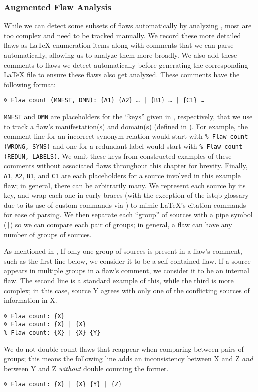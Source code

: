 \subsubsection{Augmented Flaw Analysis}\label{aug-flaw-analysis}
While we can detect some subsets of flaws automatically by analyzing
\ourApproachGlossary, most are too complex and need to be tracked manually. We
record these more detailed flaws as \LaTeX{} enumeration items along with
comments that we can parse automatically, allowing us to analyze them more
broadly. We also add these comments to flaws we detect automatically before
generating the corresponding \LaTeX{} file to ensure these flaws also get
analyzed. These comments have the following format:
\begin{displayquote}
    \texttt{\% Flaw count (MNFST, DMN): \{A1\} \{A2\} \dots{} | \{B1\} %
        \dots{} | \{C1\} \dots}
\end{displayquote}
\texttt{MNFST} and \texttt{DMN} are placeholders for the ``keys'' given in
, respectively, that we use to track a
flaw's manifestation(s) and domain(s) (defined in ). For
example, the comment line for an incorrect synonym relation would start with
\texttt{\% Flaw count (WRONG, SYNS)} and one for a redundant label would
start with \texttt{\% Flaw count (REDUN, LABELS)}. We omit these keys from
constructed examples of these comments without associated flaws throughout this
chapter for brevity. Finally, \texttt{A1}, \texttt{A2}, %
\texttt{B1}, and \texttt{C1} are each placeholders for a source involved in
this example flaw; in general, there can be arbitrarily many. We represent each
source by its \BibTeX{} key, and wrap each one in curly braces (with the
exception of the \acs{istqb} glossary due to its use of custom commands via
) to mimic \LaTeX{}'s citation commands for ease of parsing.
We then separate each ``group'' of sources with a pipe symbol (\texttt{|}) so
we can compare each pair of groups; in general, a flaw can have any number of
groups of sources.

As mentioned in , \oneSrcDistinct{} If only one group
of sources is present in a flaw's comment, such as the first line below, we
consider it to be a self-contained flaw. If a
source appears in multiple groups in a flaw's comment, we consider it to
be an internal flaw. The second line is a standard example of this, while the
third is more complex; in this case, source Y agrees with only one of the
conflicting sources of information in X.
\begin{displayquote}
    \texttt{\% Flaw count: \{X\}\\\% Flaw count: \{X\} | \{X\}\\
        \% Flaw count: \{X\} | \{X\} \{Y\}}
\end{displayquote}
We do not double count flaws that reappear when comparing between pairs of
groups; this means the following line adds an inconsistency between X and Z
\emph{and} between Y and Z \emph{without} double counting the former.
\begin{displayquote}
    \texttt{\% Flaw count: \{X\} | \{X\} \{Y\} | \{Z\}}
\end{displayquote}

